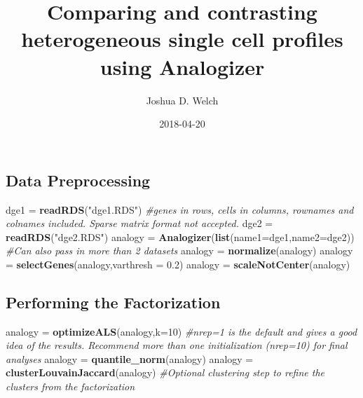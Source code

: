 \documentclass[]{article}
\title{Comparing and contrasting heterogeneous single cell profiles using
Analogizer}
\author{Joshua D. Welch}
\date{2018-04-20}
\newenvironment{Shaded}{\begin{snugshade}}{\end{snugshade}}
\newcommand{\KeywordTok}[1]{\textcolor[rgb]{0.13,0.29,0.53}{\textbf{#1}}}
\newcommand{\DataTypeTok}[1]{\textcolor[rgb]{0.13,0.29,0.53}{#1}}
\newcommand{\DecValTok}[1]{\textcolor[rgb]{0.00,0.00,0.81}{#1}}
\newcommand{\FloatTok}[1]{\textcolor[rgb]{0.00,0.00,0.81}{#1}}
\newcommand{\StringTok}[1]{\textcolor[rgb]{0.31,0.60,0.02}{#1}}
\newcommand{\CommentTok}[1]{\textcolor[rgb]{0.56,0.35,0.01}{\textit{#1}}}
\newcommand{\NormalTok}[1]{#1}
\begin{document}
\maketitle

\subsection{Data Preprocessing}\label{data-preprocessing}

\begin{Shaded}
\begin{Highlighting}[]
\NormalTok{dge1 =}\StringTok{ }\KeywordTok{readRDS}\NormalTok{(}\StringTok{"dge1.RDS"}\NormalTok{) }\CommentTok{#genes in rows, cells in columns, rownames and colnames included. Sparse matrix format not accepted.}
\NormalTok{dge2 =}\StringTok{ }\KeywordTok{readRDS}\NormalTok{(}\StringTok{"dge2.RDS"}\NormalTok{)}
\NormalTok{analogy =}\StringTok{ }\KeywordTok{Analogizer}\NormalTok{(}\KeywordTok{list}\NormalTok{(}\DataTypeTok{name1=}\NormalTok{dge1,}\DataTypeTok{name2=}\NormalTok{dge2)) }\CommentTok{#Can also pass in more than 2 datasets}
\NormalTok{analogy =}\StringTok{ }\KeywordTok{normalize}\NormalTok{(analogy)}
\NormalTok{analogy =}\StringTok{ }\KeywordTok{selectGenes}\NormalTok{(analogy,}\DataTypeTok{varthresh =} \FloatTok{0.2}\NormalTok{)}
\NormalTok{analogy =}\StringTok{ }\KeywordTok{scaleNotCenter}\NormalTok{(analogy)}
\end{Highlighting}
\end{Shaded}

\subsection{Performing the
Factorization}\label{performing-the-factorization}

\begin{Shaded}
\begin{Highlighting}[]
\NormalTok{analogy =}\StringTok{ }\KeywordTok{optimizeALS}\NormalTok{(analogy,}\DataTypeTok{k=}\DecValTok{10}\NormalTok{) }\CommentTok{#nrep=1 is the default and gives a good idea of the results. Recommend more than one initialization (nrep=10) for final analyses}
\NormalTok{analogy =}\StringTok{ }\KeywordTok{quantile_norm}\NormalTok{(analogy)}
\NormalTok{analogy =}\StringTok{ }\KeywordTok{clusterLouvainJaccard}\NormalTok{(analogy) }\CommentTok{#Optional clustering step to refine the clusters from the factorization}
\end{Highlighting}
\end{Shaded}
\end{document}
